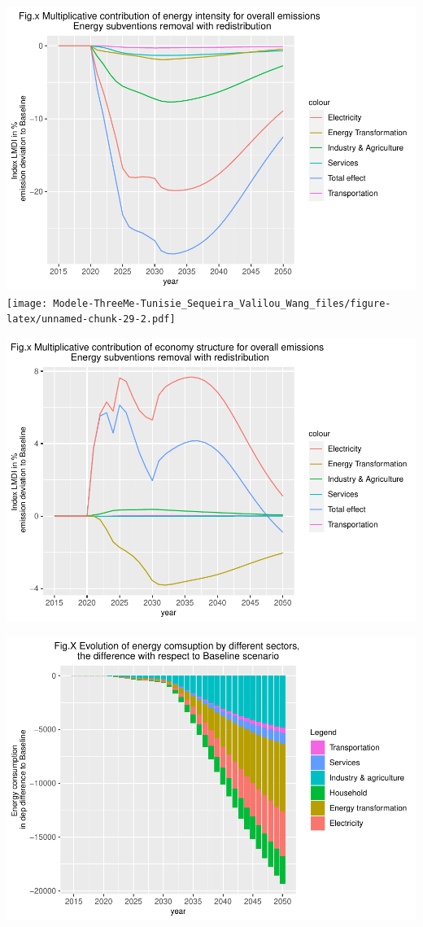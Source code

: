\documentclass[
]{article}
\begin{document}
\includegraphics{Modele-ThreeMe-Tunisie_Sequeira_Valilou_Wang_files/figure-latex/unnamed-chunk-29-1.pdf}
\texttt{[image: Modele-ThreeMe-Tunisie\_Sequeira\_Valilou\_Wang\_files/figure-latex/unnamed-chunk-29-2.pdf]}

\includegraphics{Modele-ThreeMe-Tunisie_Sequeira_Valilou_Wang_files/figure-latex/unnamed-chunk-30-1.pdf}

\includegraphics{Modele-ThreeMe-Tunisie_Sequeira_Valilou_Wang_files/figure-latex/unnamed-chunk-31-1.pdf}
\end{document}
